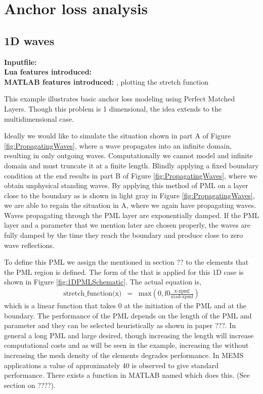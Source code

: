 \clearpage
\section{Anchor loss analysis}
\subsection{1D waves}
\begin{flushleft}
  \textbf{Inputfile:}
  \\
  \textbf{Lua features introduced:}
  \\
  \textbf{MATLAB features introduced:}
  ,
  plotting the stretch function
\end{flushleft}
This example illustrates basic anchor loss
modeling using Perfect Matched Layers. Though
this problem is 1 dimensional, the idea extends
to the multidimensional case. 

Ideally we would like to simulate the situation
shown in part A of Figure \ref{fig:PropagatingWaves},
where a wave propagates into an infinite domain,
resulting in only outgoing waves. Computationally
we cannot model and infinite domain and must truncate
it at a finite length. Blindly applying a fixed boundary
condition at the end results in part B of Figure
\ref{fig:PropagatingWaves}, where we obtain unphysical
standing waves. By applying this method of PML on a 
layer close to the boundary as is shown in light gray in 
Figure \ref{fig:PropagatingWaves}, we are able to regain
the situation in A, where we again have propagating waves.
Waves propagating through the PML layer are exponentially
damped. If the PML layer and a parameter  that
we mention later are chosen properly, the waves are fully
damped by the time they reach the boundary and produce 
close to zero wave reflections. 

To define this PML we assign the  
mentioned in section ?? to the elements that the PML 
region is defined. The form of the 
that is applied for this 1D case is shown in 
Figure \ref{fig:1DPMLSchematic}. The actual equation is,
\begin{eqnarray}
\text{stretch\_function(x)}
&=& \text{max}\left(0, \text{f0} \frac{\text{x-xpml}}
                                      {\text{xrad-xpml}}\right)
\end{eqnarray}
which is a linear function that takes 0 at the initiation of
the PML and  at the boundary. The performance of the 
PML depends on the length of the PML and parameter  and
they can be selected heuristically as shown in paper ???. 
In general a long PML and large  desired, though
increasing the length will increase computational costs and 
as will be seen in the example, increasing the  without
increasing the mesh density of the elements degrades performance.
In MEMS applications a value of approximately 40 is observed to
give standard performance.
There exists a function in MATLAB named  which
does this. (See section on ????).

